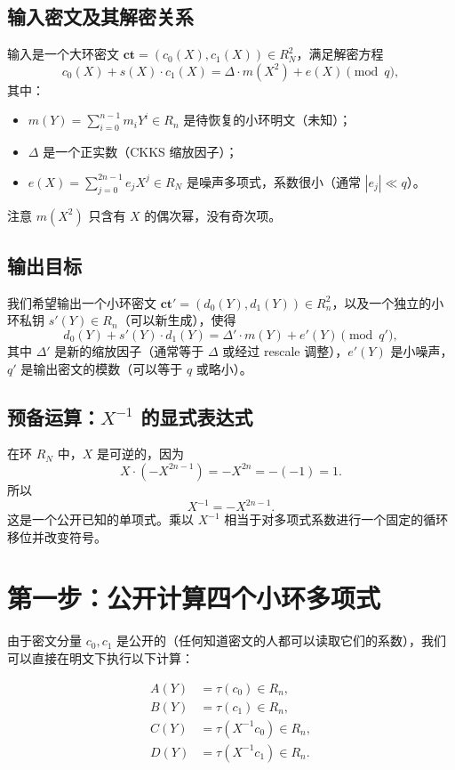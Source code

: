 \documentclass{article}
\begin{document}
\subsection{输入密文及其解密关系}
输入是一个大环密文 $\mathbf{ct} = (c_0(X), c_1(X)) \in R_N^2$，满足解密方程
\[
c_0(X) + s(X) \cdot c_1(X) = \Delta \cdot m(X^2) + e(X) \pmod{q},
\tag{Dec}
\]
其中：
\begin{itemize}
  \item $m(Y) = \sum_{i=0}^{n-1} m_i Y^i \in R_n$ 是待恢复的小环明文（未知）；
  \item $\Delta$ 是一个正实数（CKKS 缩放因子）；
  \item $e(X) = \sum_{j=0}^{2n-1} e_j X^j \in R_N$ 是噪声多项式，系数很小（通常 $|e_j| \ll q$）。
\end{itemize}
注意 $m(X^2)$ 只含有 $X$ 的偶次幂，没有奇次项。

\subsection{输出目标}
我们希望输出一个小环密文 $\mathbf{ct}' = (d_0(Y), d_1(Y)) \in R_n^2$，以及一个独立的小环私钥 $s'(Y) \in R_n$（可以新生成），使得
\[
d_0(Y) + s'(Y) \cdot d_1(Y) = \Delta' \cdot m(Y) + e'(Y) \pmod{q'},
\tag{Out}
\]
其中 $\Delta'$ 是新的缩放因子（通常等于 $\Delta$ 或经过 rescale 调整），$e'(Y)$ 是小噪声，$q'$ 是输出密文的模数（可以等于 $q$ 或略小）。

\subsection{预备运算：$X^{-1}$ 的显式表达式}
在环 $R_N$ 中，$X$ 是可逆的，因为
\[
X \cdot (-X^{2n-1}) = -X^{2n} = -(-1) = 1.
\]
所以
\[
X^{-1} = -X^{2n-1}.
\]
这是一个公开已知的单项式。乘以 $X^{-1}$ 相当于对多项式系数进行一个固定的循环移位并改变符号。

\section{第一步：公开计算四个小环多项式}

由于密文分量 $c_0, c_1$ 是公开的（任何知道密文的人都可以读取它们的系数），我们可以直接在明文下执行以下计算：

\begin{align}
A(Y) &= \tau(c_0) \in R_n, \label{eq:A} \\
B(Y) &= \tau(c_1) \in R_n, \label{eq:B} \\
C(Y) &= \tau(X^{-1} c_0) \in R_n, \label{eq:C} \\
D(Y) &= \tau(X^{-1} c_1) \in R_n. \label{eq:D}
\end{align}
\end{document}
